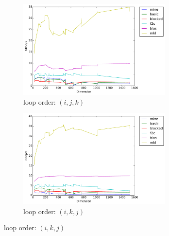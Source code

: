 \documentclass[12pt]{article}
\numberwithin{equation}{section}
\begin{document}
\begin{figure}[!ht]
   \begin{subfigure}
      \centering
        \begin{center}
      \includegraphics[width=0.85\textwidth] {ijk}
        \end{center}
      \label{aload0}
      \caption{loop order: $(i, j, k)$}
  \end{subfigure}
  \begin{subfigure}
      \centering
        \begin{center}
      \includegraphics[width=0.85\textwidth] {ikj}
        \end{center}
      \label{aload1}
      \caption{loop order: $(i, k, j)$}
  \end{subfigure}

\end{figure}
\end{document}
